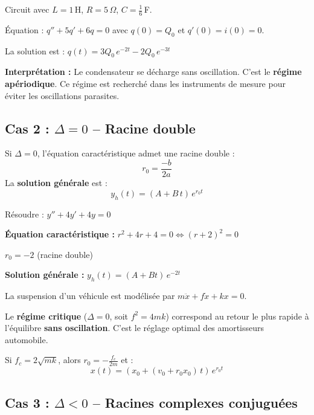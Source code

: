 \documentclass[a4paper,11pt]{article}
\begin{document}
\begin{appliindus}
Circuit avec $L = 1\,$H, $R = 5\,\Omega$, $C = \frac{1}{6}\,$F.

Équation : $q'' + 5q' + 6q = 0$ avec $q(0) = Q_0$ et $q'(0) = i(0) = 0$.

La solution est : $q(t) = 3Q_0\,e^{-2t} - 2Q_0\,e^{-3t}$

\textbf{Interprétation :} Le condensateur se décharge sans oscillation. C'est le \textbf{régime apériodique}. Ce régime est recherché dans les instruments de mesure pour éviter les oscillations parasites.
\end{appliindus}

\subsection{Cas 2 : $\Delta = 0$ -- Racine double}

\begin{theoreme}
Si $\Delta = 0$, l'équation caractéristique admet une racine double :
\[
r_0 = \frac{-b}{2a}
\]
La \textbf{solution générale} est :
\[
\boxed{y_h(t) = (A + B\,t)\,e^{r_0 t}}
\]
\end{theoreme}

\begin{exemple}
Résoudre : $y'' + 4y' + 4y = 0$

\textbf{Équation caractéristique :} $r^2 + 4r + 4 = 0 \Leftrightarrow (r+2)^2 = 0$

$r_0 = -2$ (racine double)

\textbf{Solution générale :} $y_h(t) = (A + Bt)\,e^{-2t}$
\end{exemple}

\begin{appliindus}
La suspension d'un véhicule est modélisée par $m\ddot{x} + f\dot{x} + kx = 0$.

Le \textbf{régime critique} ($\Delta = 0$, soit $f^2 = 4mk$) correspond au retour le plus rapide à l'équilibre \textbf{sans oscillation}. C'est le réglage optimal des amortisseurs automobile.

Si $f_c = 2\sqrt{mk}$, alors $r_0 = -\frac{f_c}{2m}$ et :
\[
x(t) = (x_0 + (v_0 + r_0 x_0)\,t)\,e^{r_0 t}
\]
\end{appliindus}

\subsection{Cas 3 : $\Delta < 0$ -- Racines complexes conjuguées}
\end{document}
